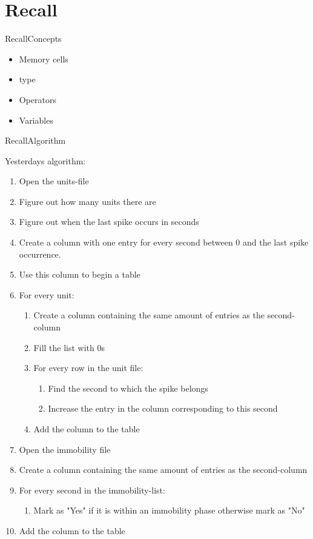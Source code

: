 \documentclass[aspectratio=169]{beamer}
\begin{document}
\section{Recall}
\begin{frame}{Recall}{Concepts}
\begin{itemize}
	\item Memory cells
	\item type
	\item Operators
	\item Variables
\end{itemize}
\end{frame}

\begin{frame}{Recall}{Algorithm}

Yesterdays algorithm:

\begin{enumerate}
\item {Open the units-file}
\item {Figure out how many units there are}
\item {Figure out when the last spike occurs in seconds}
\item {Create a column with one entry for every second between 0 and the last spike occurrence.}
\item {Use this column to begin a table}
\item {For every unit:}
\begin{enumerate}
	\item {Create a column containing the same amount of entries as the second-column}
	\item {Fill the list with 0s}
	\item {For every row in the unit file:}
	\begin{enumerate}
		\item {Find the second to which the spike belongs}
		\item {Increase the entry in the column corresponding to this second}
	\end{enumerate}
	\item {Add the column to the table}
\end{enumerate}
\item {Open the immobility file}
\item {Create a column containing the same amount of entries as the second-column}
\item {For every second in the immobility-list:}
\begin{enumerate}
	\item {Mark as "Yes" if it is within an immobility phase otherwise mark as "No"}
\end{enumerate}
\item {Add the column to the table}
\end{enumerate}
\end{frame}
\end{document}
